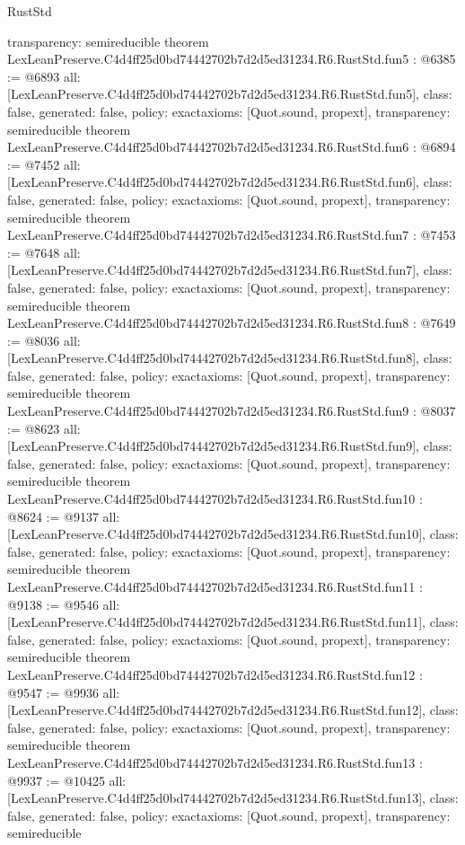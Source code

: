 \begin{lexlean}{RustStd}
\begin{coremodule}
{  transparency: semireducible
}
theorem LexLeanPreserve.C4d4ff25d0bd74442702b7d2d5ed31234.R6.RustStd.fun5 : @6385 := @6893 {
  all: [LexLeanPreserve.C4d4ff25d0bd74442702b7d2d5ed31234.R6.RustStd.fun5],
  class: false,
  generated: false,
  policy: exact{axioms: [Quot.sound, propext]},
  transparency: semireducible
}
theorem LexLeanPreserve.C4d4ff25d0bd74442702b7d2d5ed31234.R6.RustStd.fun6 : @6894 := @7452 {
  all: [LexLeanPreserve.C4d4ff25d0bd74442702b7d2d5ed31234.R6.RustStd.fun6],
  class: false,
  generated: false,
  policy: exact{axioms: [Quot.sound, propext]},
  transparency: semireducible
}
theorem LexLeanPreserve.C4d4ff25d0bd74442702b7d2d5ed31234.R6.RustStd.fun7 : @7453 := @7648 {
  all: [LexLeanPreserve.C4d4ff25d0bd74442702b7d2d5ed31234.R6.RustStd.fun7],
  class: false,
  generated: false,
  policy: exact{axioms: [Quot.sound, propext]},
  transparency: semireducible
}
theorem LexLeanPreserve.C4d4ff25d0bd74442702b7d2d5ed31234.R6.RustStd.fun8 : @7649 := @8036 {
  all: [LexLeanPreserve.C4d4ff25d0bd74442702b7d2d5ed31234.R6.RustStd.fun8],
  class: false,
  generated: false,
  policy: exact{axioms: [Quot.sound, propext]},
  transparency: semireducible
}
theorem LexLeanPreserve.C4d4ff25d0bd74442702b7d2d5ed31234.R6.RustStd.fun9 : @8037 := @8623 {
  all: [LexLeanPreserve.C4d4ff25d0bd74442702b7d2d5ed31234.R6.RustStd.fun9],
  class: false,
  generated: false,
  policy: exact{axioms: [Quot.sound, propext]},
  transparency: semireducible
}
theorem LexLeanPreserve.C4d4ff25d0bd74442702b7d2d5ed31234.R6.RustStd.fun10 : @8624 := @9137 {
  all: [LexLeanPreserve.C4d4ff25d0bd74442702b7d2d5ed31234.R6.RustStd.fun10],
  class: false,
  generated: false,
  policy: exact{axioms: [Quot.sound, propext]},
  transparency: semireducible
}
theorem LexLeanPreserve.C4d4ff25d0bd74442702b7d2d5ed31234.R6.RustStd.fun11 : @9138 := @9546 {
  all: [LexLeanPreserve.C4d4ff25d0bd74442702b7d2d5ed31234.R6.RustStd.fun11],
  class: false,
  generated: false,
  policy: exact{axioms: [Quot.sound, propext]},
  transparency: semireducible
}
theorem LexLeanPreserve.C4d4ff25d0bd74442702b7d2d5ed31234.R6.RustStd.fun12 : @9547 := @9936 {
  all: [LexLeanPreserve.C4d4ff25d0bd74442702b7d2d5ed31234.R6.RustStd.fun12],
  class: false,
  generated: false,
  policy: exact{axioms: [Quot.sound, propext]},
  transparency: semireducible
}
theorem LexLeanPreserve.C4d4ff25d0bd74442702b7d2d5ed31234.R6.RustStd.fun13 : @9937 := @10425 {
  all: [LexLeanPreserve.C4d4ff25d0bd74442702b7d2d5ed31234.R6.RustStd.fun13],
  class: false,
  generated: false,
  policy: exact{axioms: [Quot.sound, propext]},
  transparency: semireducible
}
\end{coremodule}
\end{lexlean}
